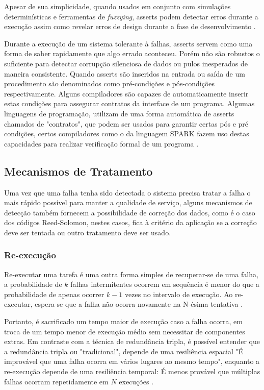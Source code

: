 Apesar de sua simplicidade, quando usados em conjunto com simulações determinísticas e ferramentas de \textit{fuzzying}, asserts podem detectar erros durante a execução assim como revelar erros de design durante a fase de desenvolvimento \cite{TigerBeetleSafety} \cite{PowerOf10Rules}.

Durante a execução de um sistema tolerante à falhas, asserts servem como uma forma de saber rapidamente que algo errado aconteceu. Porém não são robustos o suficiente para detectar corrupção silenciosa de dados ou pulos inesperados de maneira consistente. Quando asserts são inseridos na entrada ou saída de um procedimento são denominados como pré-condições e pós-condições respectivamente. Alguns compiladores são capazes de automaticamente inserir estas condições para assegurar contratos da interface de um programa. Algumas linguagens de programação, utilizam de uma forma automática de asserts chamados de "contratos", que podem ser usados para garantir certas pós e pré condições, certos compiladores como o da linguagem SPARK fazem uso destas capacidades para realizar verificação formal de um programa \cite{SPARKContracts}.

\subsection{Mecanismos de Tratamento}

Uma vez que uma falha tenha sido detectada o sistema precisa tratar a falha o mais rápido possível para manter a qualidade de serviço, alguns mecanismos de detecção também fornecem a possibilidade de correção dos dados, como é o caso dos códigos Reed-Solomon, nestes casos, fica à critério da aplicação se a correção deve ser tentada ou outro tratamento deve ser usado.

\subsubsection{Re-execução}

Re-executar uma tarefa é uma outra forma simples de recuperar-se de uma falha, a probabilidade de $k$ falhas intermitentes ocorrem em sequência é menor do que a probabilidade de apenas ocorrer $k - 1$ vezes no intervalo de execução. Ao re-executar, espera-se que a falha não ocorra novamente na N-ésima tentativa \cite{DependabilityInEmbeddedSystems} \cite{SchedAndOptOfDistributedFT}.

Portanto, é sacrificado um tempo maior de execução caso a falha ocorra, em troca de um tempo menor de execução médio sem necessitar de componentes extras. Em contraste com a técnica de redundância tripla, é possível entender que a redundância tripla ou "tradicional", depende de uma resiliência espacial "É improvável que uma falha ocorra em vários lugares ao mesmo tempo", enquanto a re-execução depende de uma resiliência temporal: É menos provável que múltiplas falhas ocorram repetidamente em $N$ execuções \cite{FaultTolerantSystems}.

